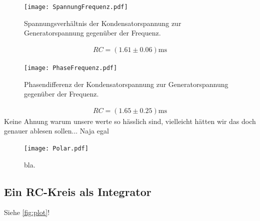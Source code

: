 \begin{figure}[H]
  \centering
  \texttt{[image: SpannungFrequenz.pdf]}
  \caption{Spannungsverhältnis der Kondensatorspannung zur Generatorspannung gegenüber der Frequenz.}
  \label{fig:SpannungFrequenz_plot}
\end{figure}

\begin{align*}
  RC=(1.61 ± 0.06)\si{\milli\second}
\end{align*}

\begin{figure}[H]
  \centering
  \texttt{[image: PhaseFrequenz.pdf]}
  \caption{Phasendifferenz der Kondensatorspannung zur Generatorspannung gegenüber der Frequenz.}
  \label{fig:PhaseFrequenz_plot}
\end{figure}
\begin{align*}
  RC=(1.65 ± 0.25)\si{\milli\second}
\end{align*}
Keine Ahnung warum unsere werte so hässlich sind, vielleicht hätten wir das doch genauer ablesen sollen... Naja egal


\begin{figure}[H]
  \centering
  \texttt{[image: Polar.pdf]}
  \caption{bla.}
  \label{fig:Polar_plot}
\end{figure}

\subsection{Ein RC-Kreis als Integrator} %
\label{sub:Integrator}




Siehe \autoref{fig:plot}!
